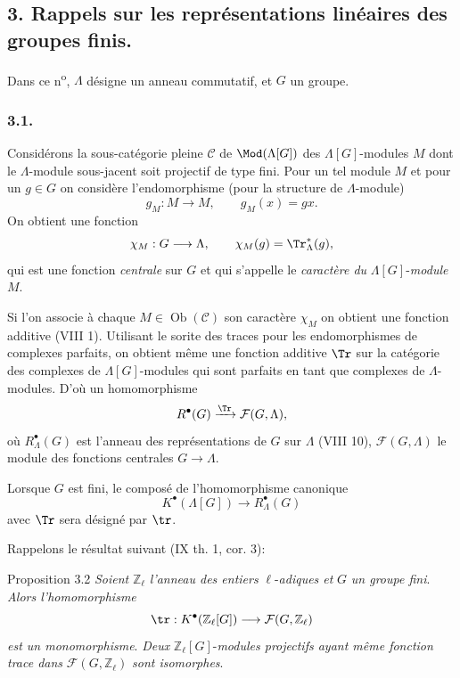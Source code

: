 \subsection*{3. Rappels sur les représentations linéaires des groupes finis.}

Dans ce n\textsuperscript{o}, $\Lambda$ désigne un anneau commutatif, et $G$ un groupe.

\subsubsection*{3.1.}

Considérons la sous-catégorie pleine $\mathcal{C}$ de $\Mod(\Lambda[G])$ des $\Lambda[G]$-modules $M$ dont le $\Lambda$-module sous-jacent soit projectif de type fini. Pour un tel module $M$ et pour un $g\in G$ on considère l'endomorphisme (pour la structure de $\Lambda$-module)
\[
g_M:M\longrightarrow M,
\qquad g_M(x)=gx.
\]
On obtient une fonction
\[
\chi_M:G\longrightarrow \Lambda,
\qquad \chi_M(g)=\Tr^*_\Lambda(g),
\]
qui est une fonction \emph{centrale} sur $G$ et qui s'appelle le \emph{caractère du} $\Lambda[G]$-\emph{module} $M$.

Si l'on associe à chaque $M\in\operatorname{Ob}(\mathcal{C})$ son caractère $\chi_M$ on obtient une fonction additive (VIII 1). Utilisant le sorite des traces pour les endomorphismes de complexes parfaits, on obtient même une fonction additive $\Tr$ sur la catégorie des complexes de $\Lambda[G]$-modules qui sont parfaits en tant que complexes de $\Lambda$-modules. D'où un homomorphisme
\[
R^{\bullet}(G)\xrightarrow{\Tr}\mathcal{F}(G,\Lambda),
\]
où $R^{\bullet}_{\Lambda}(G)$ est l'anneau des représentations de $G$ sur $\Lambda$ (VIII 10), $\mathcal{F}(G,\Lambda)$ le module des fonctions centrales $G\to\Lambda$.

Lorsque $G$ est fini, le composé de l'homomorphisme canonique
\[
K^{\bullet}(\Lambda[G])\longrightarrow R^{\bullet}_{\Lambda}(G)
\]
avec $\Tr$ sera désigné par $\tr$.

Rappelons le résultat suivant (IX th. 1, cor. 3):

\begin{statement}{Proposition 3.2}
\emph{Soient} $\mathbb{Z}_\ell$ \emph{l'anneau des entiers} $\ell$-\emph{adiques et} $G$ \emph{un groupe fini}. \emph{Alors l'homomorphisme}
\[
\tr:K^{\bullet}(\mathbb{Z}_\ell[G])\longrightarrow \mathcal{F}(G,\mathbb{Z}_\ell)
\]
\emph{est un monomorphisme}. \emph{Deux} $\mathbb{Z}_\ell[G]$-\emph{modules projectifs ayant même fonction trace dans} $\mathcal{F}(G,\mathbb{Z}_\ell)$ \emph{sont isomorphes}.
\end{statement}

